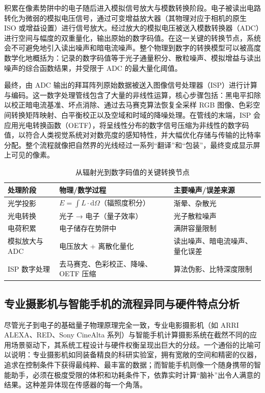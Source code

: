 \documentclass[12pt, a4paper]{ctexart}
\begin{document}
积累在像素势阱中的电子随后进入模拟信号放大与模数转换阶段。电子被读出电路转化为微弱的模拟电压信号，通过可变增益放大器（其物理对应于相机的原生 ISO 或增益设置）进行信号放大。经过放大的模拟电压被送入模数转换器（ADC）进行空间与幅度的双重量化，输出原始的数字码值。在这一关键的转换节点，系统会不可避免地引入读出噪声和暗电流噪声。整个物理到数字的转换模型可以被高度数学化地概括为：记录的数字码值等于光子通量积分、散粒噪声、模拟增益与读出噪声的综合函数结果，并受限于 ADC 的最大量化阈值。

最终，由 ADC 输出的拜耳阵列原始数据被送入图像信号处理器（ISP）进行计算与编码。这一数字处理管线包含了大量的非线性运算，核心步骤包括：黑电平扣除以校正暗电流基准、坏点消除、通过去马赛克算法恢复全采样 RGB 图像、色彩空间转换矩阵映射、白平衡校正以及空域和时域的降噪处理。在管线的末端，ISP 会应用光电转换函数（OETF），将呈线性分布的数字信号压缩为非线性的数字码值，以符合人类视觉系统对对数亮度的感知特性，并大幅优化存储与传输的比特率分配。整个流程就像把自然界的光线经过一系列“翻译”和“包装”，最终变成显示屏上可见的像素。

\begin{table}[H]
\centering
\caption{从辐射光到数字码值的关键转换节点}
\begin{tabular}{@{} >{\raggedright\arraybackslash}p{3cm} >{\raggedright\arraybackslash}p{6cm} >{\raggedright\arraybackslash}p{5cm} @{}}
\toprule
\textbf{处理阶段} & \textbf{物理/数学过程} & \textbf{主要噪声/误差来源} \\ \midrule
光学投影          & $E = \int L \cdot \mathrm{d}\Omega$（辐照度积分） & 渐晕、杂散光 \\
光电转换          & 光子 → 电子（量子效率） & 光子散粒噪声 \\
电荷积累          & 电子储存在势阱中 & 满阱容量限制 \\
模拟放大与 ADC     & 电压放大 + 离散化量化 & 读出噪声、暗电流噪声、量化误差 \\
ISP 数字处理       & 去马赛克、色彩校正、降噪、OETF 压缩 & 算法伪影、比特深度限制 \\ \bottomrule
\end{tabular}
\end{table}

\subsection{专业摄影机与智能手机的流程异同与硬件特点分析}

尽管光子到电子的基础量子物理原理完全一致，专业电影摄影机（如 ARRI ALEXA、RED、Sony CineAlta 系列）与智能手机计算摄影系统在截然不同的应用场景驱动下，其系统工程设计与硬件权衡呈现出巨大的分歧。一个通俗的比喻可以说明：专业摄影机如同装备精良的科研实验室，拥有宽敞的空间和精密的仪器，追求在控制条件下获得最纯粹、最丰富的数据；而智能手机则像一个随身携带的智能助手，必须在极度受限的体积和功耗条件下，依靠实时计算“脑补”出令人满意的结果。这种差异体现在传感器的每一个角落。
\end{document}
